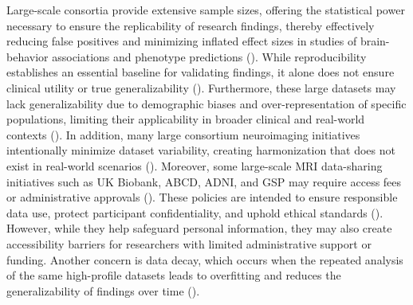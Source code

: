 Large-scale consortia provide extensive sample sizes, offering the statistical 
power necessary to ensure the replicability of research findings, 
thereby effectively reducing false positives and minimizing inflated effect 
sizes in studies of brain-behavior associations and phenotype predictions (\cite{marek2024replicability}). 
While reproducibility establishes an essential baseline for validating findings, 
it alone does not ensure clinical utility or true generalizability (\cite{kiar2024experimental}). 
Furthermore, these large datasets may lack generalizability due to demographic biases 
and over-representation of specific populations, limiting their applicability in broader clinical 
and real-world contexts (\cite{marek2024replicability, yang2024limits}).
In addition, many large consortium neuroimaging initiatives intentionally 
minimize dataset variability, creating harmonization that 
does not exist in real-world scenarios (\cite{adkinson2024brain}). 
Moreover, some large-scale MRI data-sharing initiatives such as UK Biobank, ABCD, ADNI, and GSP 
may require access fees or administrative approvals (\cite{miller2016multimodal, casey2018adolescent, mueller2005alzheimer,   holmes2015brain}). 
These policies are intended to ensure responsible data use, 
protect participant confidentiality, and uphold ethical standards (\cite{white2022data}). 
However, while they help safeguard personal information, they may also create accessibility barriers 
for researchers with limited administrative support or funding.
Another concern is data decay, which occurs when the repeated analysis 
of the same high-profile datasets leads to overfitting and reduces 
the generalizability of findings over time (\cite{thompson2020dataset, horien2021hitchhiker}).

